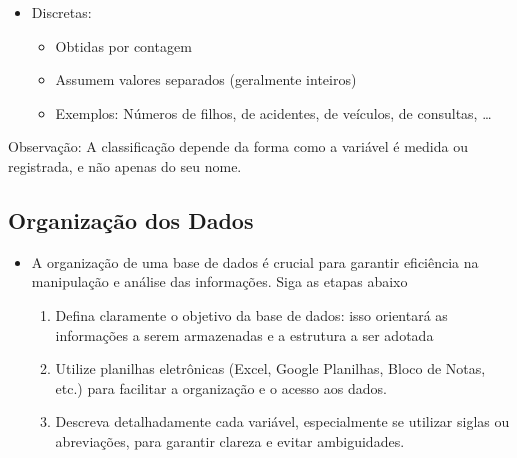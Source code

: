\documentclass[12pt]{article}
\begin{document}
\begin{enumerate}
\begin{itemize}
\begin{itemize}
\begin{itemize}
                    \item Obtidas por medição
                    \item Podem assumir qualquer valor dentro de um intervalo
                    \item Exemplos: Altura, peso, temperatura, pressão arterial, 
                    \dots
                \end{itemize}
                \item Discretas:
                \begin{itemize}
                    \item Obtidas por contagem
                    \item Assumem valores separados (geralmente inteiros)
                    \item Exemplos: Números de filhos, de acidentes, de veículos, 
                    de consultas, \dots
                \end{itemize}
            \end{itemize}
        \end{itemize}
    \end{enumerate}
    \begin{scriptsize} 
    Observação: A classificação depende da forma como a variável é medida ou 
    registrada, e não apenas do seu nome.
    \end{scriptsize}

    \subsection{Organização dos Dados}
    \begin{itemize}
        \item A organização de uma base de dados é crucial para garantir 
        eficiência na manipulação e análise das informações. Siga as etapas 
        abaixo
        \begin{enumerate}
            \item Defina claramente o objetivo da base de dados: isso orientará 
            as informações a serem armazenadas e a estrutura a ser adotada
            \item Utilize planilhas eletrônicas (Excel, Google Planilhas, Bloco 
            de Notas, etc.) para facilitar a organização e o acesso aos dados.
            \item Descreva detalhadamente cada variável, especialmente se 
            utilizar siglas ou abreviações, para garantir clareza e evitar 
            ambiguidades.
        \end{enumerate}
    \end{itemize}
\end{document}
